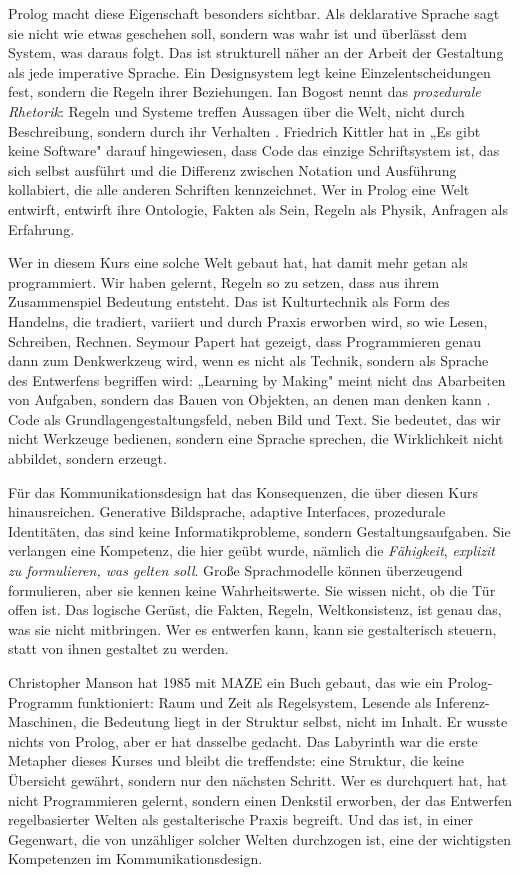 \documentclass[parskip=half,a4paper,11pt]{scrreprt}
\begin{document}
Prolog macht diese Eigenschaft besonders sichtbar. Als deklarative Sprache sagt sie nicht wie etwas geschehen soll, sondern was wahr ist und überlässt dem System, was daraus folgt. Das ist strukturell näher an der Arbeit der Gestaltung als jede imperative Sprache. Ein Designsystem legt keine Einzelentscheidungen fest, sondern die Regeln ihrer Beziehungen. Ian Bogost nennt das \textit{prozedurale Rhetorik}: Regeln und Systeme treffen Aussagen über die Welt, nicht durch Beschreibung, sondern durch ihr Verhalten \citep{Bogost2007}. Friedrich Kittler hat in „Es gibt keine Software" \citep{Kittler1993} darauf hingewiesen, dass Code das einzige Schriftsystem ist, das sich selbst ausführt und die Differenz zwischen Notation und Ausführung kollabiert, die alle anderen Schriften kennzeichnet. Wer in Prolog eine Welt entwirft, entwirft ihre Ontologie, Fakten als Sein, Regeln als Physik, Anfragen als Erfahrung.

Wer in diesem Kurs eine solche Welt gebaut hat, hat damit mehr getan als programmiert. Wir haben gelernt, Regeln so zu setzen, dass aus ihrem Zusammenspiel Bedeutung entsteht. Das ist Kulturtechnik als Form des Handelns, die tradiert, variiert und durch Praxis erworben wird, so wie Lesen, Schreiben, Rechnen. Seymour Papert hat gezeigt, dass Programmieren genau dann zum Denkwerkzeug wird, wenn es nicht als Technik, sondern als Sprache des Entwerfens begriffen wird: „Learning by Making" meint nicht das Abarbeiten von Aufgaben, sondern das Bauen von Objekten, an denen man denken kann \citep{Papert1980}. Code als Grundlagengestaltungsfeld, neben Bild und Text. Sie bedeutet, das wir nicht Werkzeuge bedienen, sondern eine Sprache sprechen, die Wirklichkeit nicht abbildet, sondern erzeugt.

Für das Kommunikationsdesign hat das Konsequenzen, die über diesen Kurs hinausreichen. Generative Bildsprache, adaptive Interfaces, prozedurale Identitäten, das sind keine Informatikprobleme, sondern Gestaltungsaufgaben. Sie verlangen eine Kompetenz, die hier geübt wurde, nämlich die \textit{Fähigkeit}, \textit{explizit zu formulieren, was gelten soll}. Große Sprachmodelle können überzeugend formulieren, aber sie kennen keine Wahrheitswerte. Sie wissen nicht, ob die Tür offen ist. Das logische Gerüst, die Fakten, Regeln, Weltkonsistenz, ist genau das, was sie nicht mitbringen. Wer es entwerfen kann, kann sie gestalterisch steuern, statt von ihnen gestaltet zu werden.

Christopher Manson hat 1985 mit MAZE ein Buch gebaut, das wie ein Prolog-Programm funktioniert: Raum und Zeit als Regelsystem, Lesende als Inferenz-Maschinen, die Bedeutung liegt in der Struktur selbst, nicht im Inhalt. Er wusste nichts von Prolog, aber er hat dasselbe gedacht. Das Labyrinth war die erste Metapher dieses Kurses und bleibt die treffendste: eine Struktur, die keine Übersicht gewährt, sondern nur den nächsten Schritt. Wer es durchquert hat, hat nicht Programmieren gelernt, sondern einen Denkstil erworben, der das Entwerfen regelbasierter Welten als gestalterische Praxis begreift. Und das ist, in einer Gegenwart, die von unzähliger solcher Welten durchzogen ist, eine der wichtigsten Kompetenzen im Kommunikationsdesign.
\end{document}
